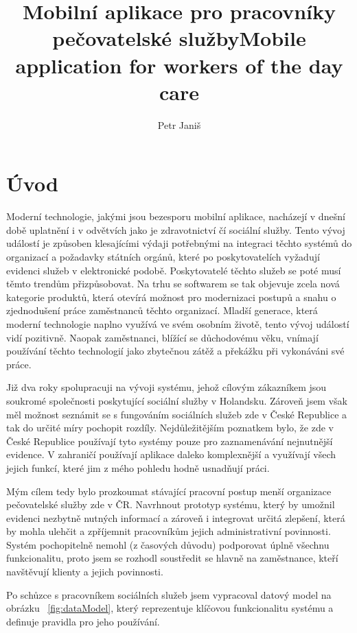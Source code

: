 \documentclass[
  glossaries,
]{kidiplom}
\title{Mobilní aplikace pro pracovníky pečovatelské služby}
\title[english]{Mobile application for workers of the day care}
\author{Petr Janiš}
\begin{document}
\maketitle

\section{Úvod}
\label{sec:intro}
Moderní technologie, jakými jsou bezesporu mobilní aplikace, nacházejí v dnešní době uplatnění i v odvětvích jako je zdravotnictví čí sociální služby. Tento vývoj událostí je způsoben klesajícími výdaji potřebnými na integraci těchto systémů do organizací a požadavky státních orgánů, které po poskytovatelích vyžadují evidenci služeb v elektronické podobě. Poskytovatelé těchto služeb se poté musí těmto trendům přizpůsobovat. Na trhu se softwarem se tak objevuje zcela nová kategorie produktů, která otevírá možnost pro modernizaci postupů a snahu o zjednodušení práce zaměstnanců těchto organizací. Mladší generace, která moderní technologie naplno využívá ve svém osobním životě, tento vývoj událostí vidí pozitivně. Naopak zaměstnanci, blížící se důchodovému věku, vnímají používání těchto technologií jako zbytečnou zátěž a překážku při vykonáváni své práce.

Již dva roky spolupracuji na vývoji systému, jehož cílovým zákazníkem jsou soukromé společnosti poskytující sociální služby v Holandsku. Zároveň jsem však měl možnost seznámit se s fungováním sociálních služeb zde v České Republice a tak do určité míry pochopit rozdíly. Nejdůležitějším poznatkem bylo, že zde v České Republice používají tyto systémy pouze pro zaznamenávání nejnutnější evidence. V zahraničí používají aplikace daleko komplexnější a využívají všech jejich funkcí, které jim z mého pohledu hodně usnadňují práci. 

Mým cílem tedy bylo prozkoumat stávající pracovní postup menší organizace pečovatelské služby zde v ČR. Navrhnout prototyp systému, který by umožnil evidenci nezbytně nutných informací a zároveň i integrovat určitá zlepšení, která by mohla ulehčit a zpříjemnit pracovníkům jejich administrativní povinnosti. Systém pochopitelně nemohl (z časových důvodu) podporovat úplně všechnu funkcionalitu, proto jsem se rozhodl soustředit se hlavně na zaměstnance, kteří navštěvují klienty a jejich povinnosti. 

Po schůzce s pracovníkem sociálních služeb jsem vypracoval datový model na obrázku ~\ref{fig:dataModel}, který reprezentuje klíčovou funkcionalitu systému a definuje pravidla pro jeho používání.
\end{document}
